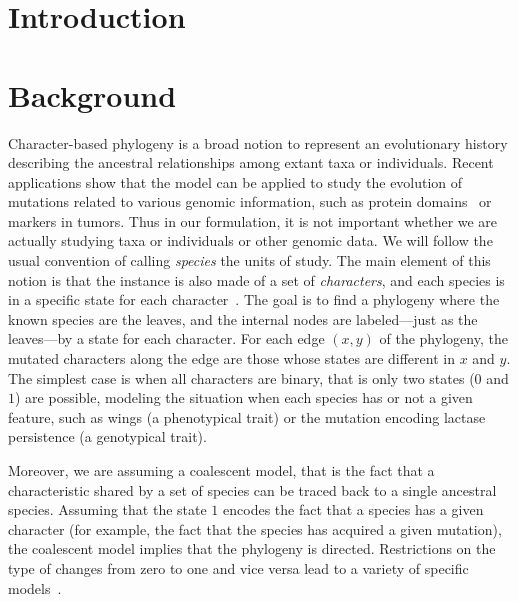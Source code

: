 \section*{Introduction}


\section*{Background}

Character-based phylogeny is a broad notion to represent an evolutionary history
describing the ancestral relationships among extant taxa or individuals. Recent applications show that
the model can be applied to study the evolution of mutations related to various genomic information, such as protein domains~\cite{Pr1} or markers in tumors.
Thus in  our formulation, it is not important whether we are actually studying taxa or
individuals or other genomic data.
We will follow the usual convention of calling
\emph{species} the units of study.
The main element of this notion is that the instance is also made of
a set of \emph{characters}, and each species is in a specific state for each character~\cite{Gusfield}.
The goal is to find a phylogeny where the known species are the leaves, and the
internal nodes are labeled---just as the leaves---by a state for each character.
For each edge $(x,y)$ of the phylogeny, the mutated characters along the edge are those whose
states are different in $x$ and $y$. The simplest case is when all characters are binary, that is only two states
($0$ and $1$) are possible,
modeling the situation  when each species has or not a given feature, such as
wings (a phenotypical trait) or the mutation encoding lactase persistence (a
genotypical trait).

Moreover, we are assuming a coalescent model, that is the fact that a characteristic
shared by a set of species can be traced back to a single ancestral species.
Assuming that the state $1$ encodes the fact that a species has a given
character (for example, the fact that the species has acquired a given mutation), the coalescent
model implies that the phylogeny is directed.
Restrictions on the type of changes from zero to one and vice versa lead to a variety of specific models~\cite{felsenstein:inferring-phylogenies}.




